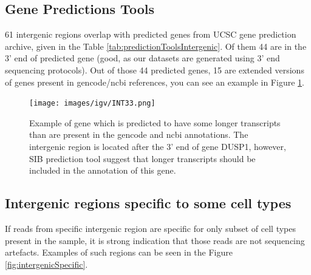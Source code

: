 \subsection{Gene Predictions Tools}

61 intergenic regions overlap with predicted genes from UCSC gene prediction archive, given in the Table \ref{tab:predictionToolsIntergenic}.
Of them 44 are in the 3' end of predicted gene (good, as our datasets are generated using 3' end sequencing protocols).
Out of those 44 predicted genes, 15 are extended versions of genes present in gencode/ncbi references,
you can see an example in Figure \ref{fig:predictedExtention}.

\begin{figure}
  \centering
  \texttt{[image: images/igv/INT33.png]}
  \caption{Example of gene which is predicted to have some longer transcripts than are present in the gencode and ncbi annotations.
  The intergenic region is located after the 3' end of gene DUSP1, however,
  SIB prediction tool suggest that longer transcripts should be included in the annotation of this gene.}
  \label{fig:predictedExtention}
\end{figure}




\subsection{Intergenic regions specific to some cell types}

If reads from specific intergenic region are specific for only subset of cell types present in the sample,
it is strong indication that those reads are not sequencing artefacts.
Examples of such regions can be seen in the Figure \ref{fig:intergenicSpecific}.

